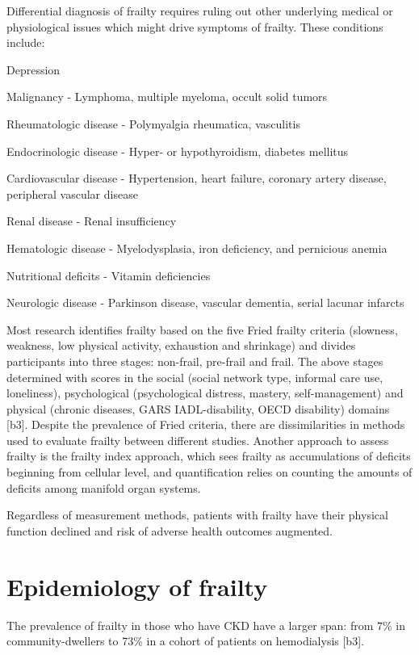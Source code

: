 \documentclass[jou]{apa6}
\begin{document}
Differential diagnosis of frailty requires ruling out other underlying medical or physiological issues which might drive symptoms of frailty. These conditions include:
\begin{APAenumerate}
	\item Depression
	\item Malignancy - Lymphoma, multiple myeloma, occult solid tumors
	\item Rheumatologic disease - Polymyalgia rheumatica, vasculitis
	\item Endocrinologic disease - Hyper- or hypothyroidism, diabetes mellitus
	\item Cardiovascular disease - Hypertension, heart failure, coronary artery disease, peripheral vascular disease
	\item Renal disease - Renal insufficiency
	\item Hematologic disease - Myelodysplasia, iron deficiency, and pernicious anemia
	\item Nutritional deficits - Vitamin deficiencies
	\item Neurologic disease - Parkinson disease, vascular dementia, serial lacunar infarcts
\end{APAenumerate}

Most research identifies frailty based on the five Fried frailty criteria (slowness, weakness, low physical activity, exhaustion and shrinkage) and divides participants into three stages: non-frail, pre-frail and frail. The above stages determined with scores in the social (social network type, informal care use, loneliness), psychological (psychological distress, mastery, self-management) and physical (chronic diseases, GARS IADL-disability, OECD disability) domains [b3]. Despite the prevalence of Fried criteria, there are dissimilarities in methods used to evaluate frailty between different studies. Another approach to assess frailty is the frailty index approach, which sees frailty as accumulations of deficits beginning from cellular level, and quantification relies on counting the amounts of deficits among manifold organ systems.

Regardless of measurement methods, patients with frailty have their physical function declined and risk of adverse health outcomes augmented.


\section{Epidemiology of frailty}
The prevalence of frailty in those who have CKD have a larger span: from 7\% in community-dwellers to 73\% in a cohort of patients on hemodialysis [b3]. 
\end{document}
